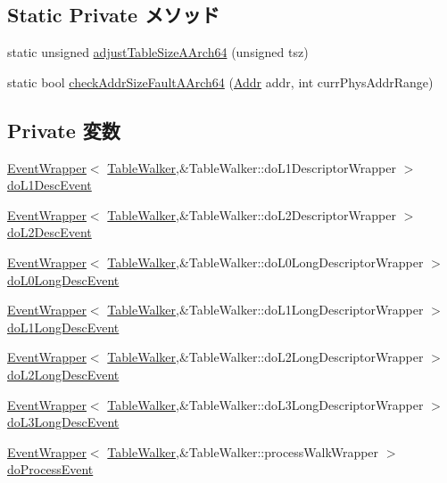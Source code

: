 \subsection*{Static Private メソッド}
\begin{DoxyCompactItemize}
\item 
static unsigned \hyperlink{classArmISA_1_1TableWalker_a60f480f39c21ef312d34cb3c8702e9a6}{adjustTableSizeAArch64} (unsigned tsz)
\item 
static bool \hyperlink{classArmISA_1_1TableWalker_a40ad630985e7888b542e819ed09e0551}{checkAddrSizeFaultAArch64} (\hyperlink{classm5_1_1params_1_1Addr}{Addr} addr, int currPhysAddrRange)
\end{DoxyCompactItemize}
\subsection*{Private 変数}
\begin{DoxyCompactItemize}
\item 
\hyperlink{classEventWrapper}{EventWrapper}$<$ \hyperlink{classArmISA_1_1TableWalker}{TableWalker},\&TableWalker::doL1DescriptorWrapper $>$ \hyperlink{classArmISA_1_1TableWalker_a896d858298222a8d8c96bc69f7db1d84}{doL1DescEvent}
\item 
\hyperlink{classEventWrapper}{EventWrapper}$<$ \hyperlink{classArmISA_1_1TableWalker}{TableWalker},\&TableWalker::doL2DescriptorWrapper $>$ \hyperlink{classArmISA_1_1TableWalker_ad6bd6e623ae7ab7d1cbbe0173e9562f4}{doL2DescEvent}
\item 
\hyperlink{classEventWrapper}{EventWrapper}$<$ \hyperlink{classArmISA_1_1TableWalker}{TableWalker},\&TableWalker::doL0LongDescriptorWrapper $>$ \hyperlink{classArmISA_1_1TableWalker_a263fa19a40da797a24e51a5edafd9215}{doL0LongDescEvent}
\item 
\hyperlink{classEventWrapper}{EventWrapper}$<$ \hyperlink{classArmISA_1_1TableWalker}{TableWalker},\&TableWalker::doL1LongDescriptorWrapper $>$ \hyperlink{classArmISA_1_1TableWalker_a5ab01b63bbaded2920f4e72569b63759}{doL1LongDescEvent}
\item 
\hyperlink{classEventWrapper}{EventWrapper}$<$ \hyperlink{classArmISA_1_1TableWalker}{TableWalker},\&TableWalker::doL2LongDescriptorWrapper $>$ \hyperlink{classArmISA_1_1TableWalker_a987d9ee7304c356462000428178c6c5e}{doL2LongDescEvent}
\item 
\hyperlink{classEventWrapper}{EventWrapper}$<$ \hyperlink{classArmISA_1_1TableWalker}{TableWalker},\&TableWalker::doL3LongDescriptorWrapper $>$ \hyperlink{classArmISA_1_1TableWalker_a6a30037030613a33f5a056cd7c9af535}{doL3LongDescEvent}
\item 
\hyperlink{classEventWrapper}{EventWrapper}$<$ \hyperlink{classArmISA_1_1TableWalker}{TableWalker},\&TableWalker::processWalkWrapper $>$ \hyperlink{classArmISA_1_1TableWalker_ac0fab25a73916f1bf677990e67557b5a}{doProcessEvent}
\end{DoxyCompactItemize}


